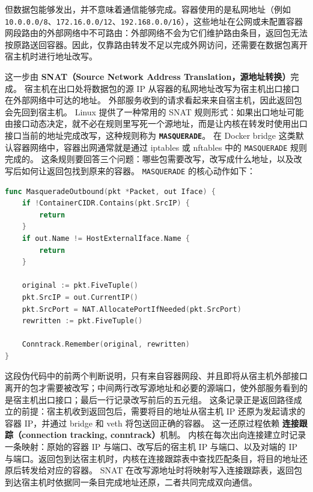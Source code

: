 但数据包能够发出，并不意味着通信能够完成。容器使用的是私网地址（例如 \texttt{10.0.0.0/8}、\texttt{172.16.0.0/12}、\texttt{192.168.0.0/16}），这些地址在公网或未配置容器网段路由的外部网络中不可路由：外部网络不会为它们维护路由条目，返回包无法按原路送回容器。因此，仅靠路由转发不足以完成外网访问，还需要在数据包离开宿主机时进行地址改写。

这一步由 \textbf{SNAT（Source Network Address Translation，源地址转换）}完成。
宿主机在出口处将数据包的源 IP 从容器的私网地址改写为宿主机出口接口在外部网络中可达的地址。
外部服务收到的请求看起来来自宿主机，因此返回包会先回到宿主机。
Linux 提供了一种常用的 SNAT 规则形式：如果出口地址可能由接口动态决定，就不必在规则里写死一个源地址，而是让内核在转发时使用出口接口当前的地址完成改写，这种规则称为 \textbf{\texttt{MASQUERADE}}。
在 Docker bridge 这类默认容器网络中，容器出网通常就是通过 iptables 或 nftables 中的 \texttt{MASQUERADE} 规则完成的。
这条规则要回答三个问题：哪些包需要改写，改写成什么地址，以及改写后如何让返回包找到原来的容器。
\texttt{MASQUERADE} 的核心动作如下：

\begin{tcolorbox}[title=MASQUERADE 的核心动作]
\begin{lstlisting}[style=codeblock, language=go]
func MasqueradeOutbound(pkt *Packet, out Iface) {
    if !ContainerCIDR.Contains(pkt.SrcIP) {
        return
    }
    if out.Name != HostExternalIface.Name {
        return
    }

    original := pkt.FiveTuple()
    pkt.SrcIP = out.CurrentIP()
    pkt.SrcPort = NAT.AllocatePortIfNeeded(pkt.SrcPort)
    rewritten := pkt.FiveTuple()

    Conntrack.Remember(original, rewritten)
}
\end{lstlisting}
\end{tcolorbox}

这段伪代码中的前两个判断说明，只有来自容器网段、并且即将从宿主机外部接口离开的包才需要被改写；中间两行改写源地址和必要的源端口，使外部服务看到的是宿主机出口接口；最后一行记录改写前后的五元组。
这条记录正是返回路径成立的前提：宿主机收到返回包后，需要将目的地址从宿主机 IP 还原为发起请求的容器 IP，并通过 bridge 和 veth 将包送回正确的容器。
这一还原过程依赖 \textbf{连接跟踪（connection tracking, conntrack）}机制。
内核在每次出向连接建立时记录一条映射：原始的容器 IP 与端口、改写后的宿主机 IP 与端口、以及对端的 IP 与端口。返回包到达宿主机时，内核在连接跟踪表中查找匹配条目，将目的地址还原后转发给对应的容器。
SNAT 在改写源地址时将映射写入连接跟踪表，返回包到达宿主机时依据同一条目完成地址还原，二者共同完成双向通信。

